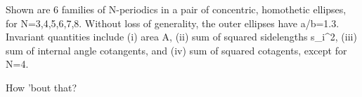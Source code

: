 Shown are 6 families of N-periodics in a pair of concentric, homothetic ellipses, for N=3,4,5,6,7,8. Without loss of generality, the outer ellipses have a/b=1.3. Invariant quantities include (i) area A, (ii) sum of squared sidelengths s_i^2, (iii) sum of internal angle cotangents, and (iv) sum of squared cotagents, except for N=4.

How 'bout that?